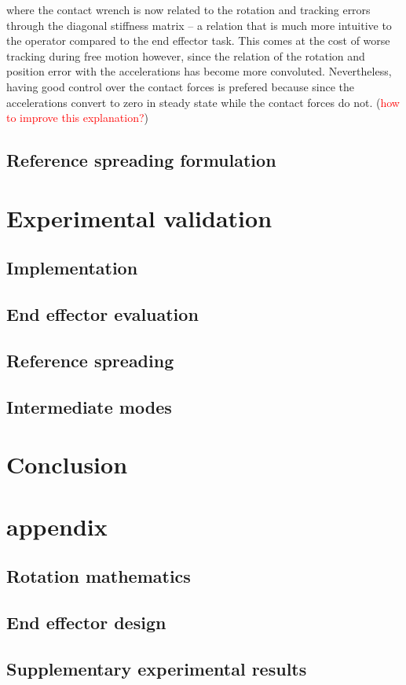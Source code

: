 \documentclass[a4paper, 10pt, conference]{ieeeconf}
\begin{document}
where the contact wrench is now related to the rotation and tracking errors through the diagonal stiffness matrix -- a relation that is much more intuitive to the operator compared to the end effector task. This comes at the cost of worse tracking during free motion however, since the relation of the rotation and position error with the accelerations has become more convoluted. Nevertheless, having good control over the contact forces is prefered because since the accelerations convert to zero in steady state while the contact forces do not. (\textcolor{red}{how to improve this explanation?})

    \subsection{Reference spreading formulation}

    \section{Experimental validation}
    \subsection{Implementation}
    \subsection{End effector evaluation}
    \subsection{Reference spreading}
    \subsection{Intermediate modes}

    \section{Conclusion}
    
\clearpage
\section*{appendix}
\subsection{Rotation mathematics}
\subsection{End effector design}
\subsection{Supplementary experimental results}
\end{document}
